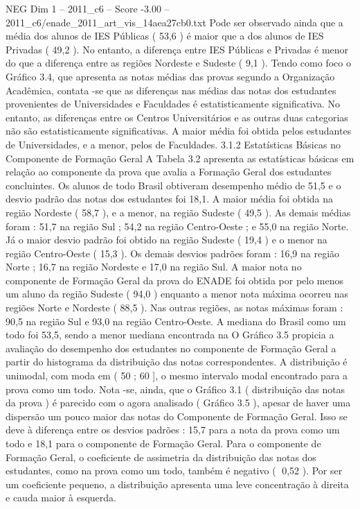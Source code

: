 \begin{textsample}{NEG Dim 1 – 2011\_c6 – Score -3.00 – 2011\_c6/enade\_2011\_art\_vis\_14aea27cb0.txt}
Pode ser observado ainda que a média dos alunos de IES Públicas ( 53,6 ) é maior que a dos alunos de IES Privadas ( 49,2 ).
No entanto, a diferença entre IES Públicas e Privadas é menor do que a diferença entre as regiões Nordeste e Sudeste ( 9,1 ).
Tendo como foco o Gráfico 3.4, que apresenta as notas médias das provas segundo a Organização Acadêmica, contata -se que as diferenças nas médias das notas dos estudantes provenientes de Universidades e Faculdades é estatisticamente significativa.
No entanto, as diferenças entre os Centros Universitários e as outras duas categorias não são estatisticamente significativas.
A maior média foi obtida pelos estudantes de Universidades, e a menor, pelos de Faculdades. 3.1.2 Estatísticas Básicas no Componente de Formação Geral A Tabela 3.2 apresenta as estatísticas básicas em relação ao componente da prova que avalia a Formação Geral dos estudantes concluintes.
Os alunos de todo Brasil obtiveram desempenho médio de 51,5 e o desvio padrão das notas dos estudantes foi 18,1.
A maior média foi obtida na região Nordeste ( 58,7 ), e a menor, na região Sudeste ( 49,5 ).
As demais médias foram : 51,7 na região Sul ; 54,2 na região Centro-Oeste ; e 55,0 na região Norte.
Já o maior desvio padrão foi obtido na região Sudeste ( 19,4 ) e o menor na região Centro-Oeste ( 15,3 ).
Os demais desvios padrões foram : 16,9 na região Norte ; 16,7 na região Nordeste e 17,0 na região Sul.
A maior nota no componente de Formação Geral da prova do ENADE foi obtida por pelo menos um aluno da região Sudeste ( 94,0 ) enquanto a menor nota máxima ocorreu nas regiões Norte e Nordeste ( 88,5 ).
Nas outras regiões, as notas máximas foram : 90,5 na região Sul e 93,0 na região Centro-Oeste.
A mediana do Brasil como um todo foi 53,5, sendo a menor mediana encontrada na O Gráfico 3.5 propicia a avaliação do desempenho dos estudantes no componente de Formação Geral a partir do histograma da distribuição das notas correspondentes.
A distribuição é unimodal, com moda em ( 50 ; 60 ], o mesmo intervalo modal encontrado para a prova como um todo.
Nota -se, ainda, que o Gráfico 3.1 ( distribuição das notas da prova ) é parecido com o agora analisado ( Gráfico 3.5 ), apesar de haver uma dispersão um pouco maior das notas do Componente de Formação Geral.
Isso se deve à diferença entre os desvios padrões : 15,7 para a nota da prova como um todo e 18,1 para o componente de Formação Geral.
Para o componente de Formação Geral, o coeficiente de assimetria da distribuição das notas dos estudantes, como na prova como um todo, também é negativo ( 0,52 ).
Por ser um coeficiente pequeno, a distribuição apresenta uma leve concentração à direita e cauda maior à esquerda.

\end{textsample}
